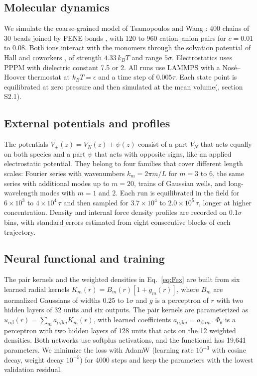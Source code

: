 \subsection*{Molecular dynamics}
We simulate the coarse-grained model of Tsamopoulos and Wang \cite{tsamopoulos2024ion}: 400 chains of 30 beads joined by FENE bonds \cite{KremerGrest1990}, with 120 to 960 cation--anion pairs for $c=0.01$ to $0.08$. Both ions interact with the monomers through the solvation potential of Hall and coworkers \cite{shen2020ion}, of strength $4.33\,k_BT$ and range $5\sigma$. 
Electrostatics uses PPPM \cite{hockney2021computer} with dielectric constant 7.5 or 2. All runs use LAMMPS \cite{thompson2022lammps} with a Nos\'e--Hoover thermostat \cite{nose1984unified,hoover1985canonical} at $k_BT=\epsilon$ and a time step of $0.005\tau$. Each state point is equilibrated at zero pressure and then simulated at the mean volume(\siref, section S2.1).

\subsection*{External potentials and profiles}
The potentials $V_\pm(z)=V_N(z)\pm\psi(z)$ consist of a part $V_N$ that acts equally on both species and a part $\psi$ that acts with opposite signs, like an applied electrostatic potential. They belong to four families that cover different length scales: Fourier series with wavenumbers $k_m=2\pi m/L$ for $m=3$ to $6$, the same series with additional modes up to $m=20$, trains of Gaussian wells, and long-wavelength modes with $m=1$ and $2$.  Each run is equilibrated in the field for $6\times10^3$ to $4\times10^4\,\tau$ and then sampled for $3.7\times10^4$ to $2.0\times10^5\,\tau$, longer at higher concentration. Density and internal force density profiles are recorded on $0.1\sigma$ bins, with standard errors estimated from eight consecutive blocks of each trajectory.

\subsection*{Neural functional and training}
The pair kernels and the weighted densities in Eq.~\ref{eq:Fex} are built from six learned radial kernels $K_m(r)=B_m(r)[1+g_m(r)]$, where $B_m$ are normalized Gaussians of widths $0.25$ to $1\sigma$ and $g$ is a perceptron of $r$ with two hidden layers of 32 units and six outputs. The pair kernels are parameterized as $u_{\alpha\beta}(r)=\sum_m a_{\alpha\beta m}K_m(r)$, with learned coefficients $a_{\alpha\beta m}=a_{\beta\alpha m}$. $\Phi_\theta$ is a perceptron with two hidden layers of 128 units that acts on the 12 weighted densities. Both networks use softplus activations, and the functional has 19{,}641 parameters. We minimize the loss with AdamW \cite{LoshchilovHutter2019} (learning rate $10^{-3}$ with cosine decay, weight decay $10^{-5}$) for 4000 steps and keep the parameters with the lowest validation residual. 

